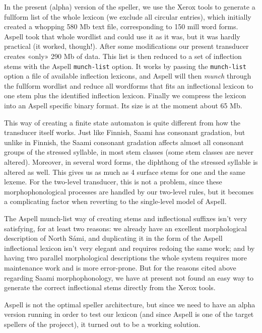 \documentclass[a4paper,english]{article}
\begin{document}
In  the present (alpha) version of the speller, we use the Xerox tools to generate a fullform list of the whole lexicon (we exclude all circular entries), which initially created a whopping 580 Mb text file, corresponding to 150 mill word forms. Aspell took that whole wordlist and could use it as it was, but it was hardly practical (it worked, though!). After some modifications our present transducer creates «only» 290 Mb of data. This list is then reduced to a set of inflection stems with the Aspell \texttt{munch-list} option. It works by passing the \texttt{munch-list} option a file of available inflection lexicons, and Aspell will then \textit{munch} through the fullform wordlist and reduce all wordforms that fits an inflectional lexicon to one stem plus the identified inflection lexicon. Finally we compress the lexicon into an Aspell specific binary format. Its size is at the moment about 65 Mb.

This way of creating a finite state automaton is quite different from how the transducer itself works. Just like Finnish, Saami has consonant gradation, but unlike in Finnish, the Saami consonant gradation affects almost all consonant groups of the stressed syllable, in most stem classes (some stem classes are never altered). Moreover, in several word forms, the diphthong of the stressed syllable is altered as well. This gives us as much as 4 surface stems for one and the same lexeme. For the two-level transducer, this is not a problem, since these morphophonological processes are handled by our two-level rules, but it becomes a complicating factor when reverting to the single-level model of Aspell.

The Aspell munch-list way of creating stems and inflectional suffixes isn't very satisfying, for at least two reasons: we already have an excellent morphological description of North Sámi, and duplicating it in the form of the Aspell inflectional lexicon isn't very elegant and requires redoing the same work; and by having two parallel morphological descriptions the whole system requires more maintenance work and is more error-prone. But for the reasons cited above regarding Saami morphophonology, we have at present not found an easy way to generate the correct inflectional stems directly from the Xerox tools.

Aspell is not the optimal speller architecture, but since we need to have an alpha version running in order to test our lexicon (and since Aspell is one of the target spellers of the projecct), it turned out to be a working solution.
\end{document}
